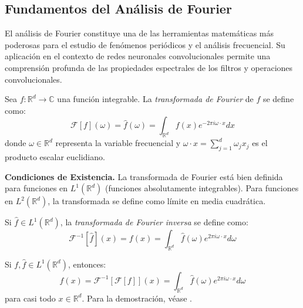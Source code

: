 \subsection{Fundamentos del Análisis de Fourier}\label{subsec:fundamentos_fourier}

El análisis de Fourier constituye una de las herramientas matemáticas más poderosas para el estudio de fenómenos periódicos y el análisis frecuencial. Su aplicación en el contexto de redes neuronales convolucionales permite una comprensión profunda de las propiedades espectrales de los filtros y operaciones convolucionales.

\begin{definition}\label{def:transformada_fourier_continua}
Sea $f: \mathbb{R}^d \to \mathbb{C}$ una función integrable. La \textit{transformada de Fourier} de $f$ se define como:
\begin{equation}
\mathcal{F}[f](\omega) = \hat{f}(\omega) = \int_{\mathbb{R}^d} f(x) e^{-2\pi i \omega \cdot x} dx
\end{equation}
donde $\omega \in \mathbb{R}^d$ representa la variable frecuencial y $\omega \cdot x = \sum_{j=1}^d \omega_j x_j$ es el producto escalar euclidiano.
\end{definition}

\textbf{Condiciones de Existencia.} La transformada de Fourier está bien definida para funciones en $L^1(\mathbb{R}^d)$ (funciones absolutamente integrables). Para funciones en $L^2(\mathbb{R}^d)$, la transformada se define como límite en media cuadrática.

\begin{definition}\label{def:transformada_fourier_inversa}
Si $\hat{f} \in L^1(\mathbb{R}^d)$, la \textit{transformada de Fourier inversa} se define como:
\begin{equation}
\mathcal{F}^{-1}[\hat{f}](x) = f(x) = \int_{\mathbb{R}^d} \hat{f}(\omega) e^{2\pi i \omega \cdot x} d\omega
\end{equation}
\end{definition}

\begin{theorem}\label{thm:inversion_fourier}
Si $f, \hat{f} \in L^1(\mathbb{R}^d)$, entonces:
\begin{equation}
f(x) = \mathcal{F}^{-1}[\mathcal{F}[f]](x) = \int_{\mathbb{R}^d} \hat{f}(\omega) e^{2\pi i \omega \cdot x} d\omega
\end{equation}
para casi todo $x \in \mathbb{R}^d$. Para la demostración, véase \citep[Theorem~8.26]{Folland1999}.
\end{theorem}

